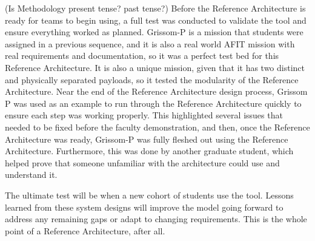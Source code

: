 (Is Methodology present tense? past tense?)
Before the Reference Architecture is ready for teams to begin using, a full test was conducted to validate the tool and ensure everything worked as planned. Grissom-P is a mission that students were assigned in a previous sequence, and it is also a real world AFIT mission with real requirements and documentation, so it was a perfect test bed for this Reference Architecture. It is also a unique mission, given that it has two distinct and physically separated payloads, so it tested the modularity of the Reference Architecture. Near the end of the Reference Architecture design process, Grissom P was used as an example to run through the Reference Architecture quickly to ensure each step was working properly. This highlighted several issues that needed to be fixed before the faculty demonstration, and then, once the Reference Architecture was ready, Grissom-P was fully fleshed out using the Reference Architecture. Furthermore, this was done by another graduate student, which helped prove that someone unfamiliar with the architecture could use and understand it. 

The ultimate test will be when a new cohort of students use the tool. Lessons learned from these system designs will improve the model going forward to address any remaining gaps or adapt to changing requirements. This is the whole point of a Reference Architecture, after all.